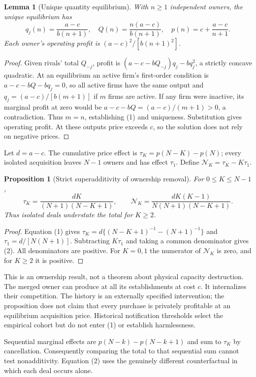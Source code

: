 \documentclass[11pt]{article}
\newtheorem{proposition}[theorem]{Proposition}
\newtheorem{lemma}[theorem]{Lemma}
\theoremstyle{remark}
\begin{document}
\begin{lemma}[Unique quantity equilibrium]
With $n\geq1$ independent owners, the unique equilibrium has
\[
 q_j(n)=\frac{a-c}{b(n+1)},\quad
 Q(n)=\frac{n(a-c)}{b(n+1)},\quad
 p(n)=c+\frac{a-c}{n+1}.                                \tag{1}
\]
Each owner's operating profit is $(a-c)^2/[b(n+1)^2]$.
\end{lemma}
\begin{proof}
Given rivals' total $Q_{-j}$, profit is $(a-c-bQ_{-j})q_j-bq_j^2$, a strictly concave quadratic. At an equilibrium an active firm's first-order condition is $a-c-bQ-bq_j=0$, so all active firms have the same output and $q_j=(a-c)/[b(m+1)]$ if $m$ firms are active. If any firm were inactive, its marginal profit at zero would be $a-c-bQ=(a-c)/(m+1)>0$, a contradiction. Thus $m=n$, establishing (1) and uniqueness. Substitution gives operating profit. At these outputs price exceeds $c$, so the solution does not rely on negative prices.
\end{proof}

Let $d=a-c$. The cumulative price effect is $\tau_K=p(N-K)-p(N)$; every isolated acquisition leaves $N-1$ owners and has effect $\tau_1$. Define $\mathcal N_K=\tau_K-K\tau_1$.

\begin{proposition}[Strict superadditivity of ownership removal]
For $0\leq K\leq N-1$,
\[
 \tau_K=\frac{dK}{(N+1)(N-K+1)},\qquad
 \mathcal N_K=\frac{dK(K-1)}{N(N+1)(N-K+1)}.              \tag{2}
\]
Thus isolated deals understate the total for $K\geq2$.
\end{proposition}
\begin{proof}
Equation (1) gives
$\tau_K=d\{(N-K+1)^{-1}-(N+1)^{-1}\}$ and
$\tau_1=d/[N(N+1)]$. Subtracting $K\tau_1$ and taking a common denominator gives (2). All denominators are positive. For $K=0,1$ the numerator of $\mathcal N_K$ is zero, and for $K\geq2$ it is positive.
\end{proof}

This is an ownership result, not a theorem about physical capacity destruction. The merged owner can produce at all its establishments at cost $c$. It internalizes their competition. The history is an externally specified intervention; the proposition does not claim that every purchase is privately profitable at an equilibrium acquisition price. Historical notification thresholds select the empirical cohort but do not enter (1) or establish harmlessness.

Sequential marginal effects are $p(N-k)-p(N-k+1)$ and sum to $\tau_K$ by cancellation. Consequently comparing the total to that sequential sum cannot test nonadditivity. Equation (2) uses the genuinely different counterfactual in which each deal occurs alone.
\end{document}
